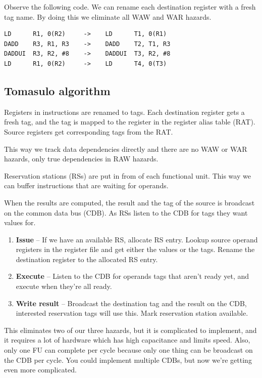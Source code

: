 \documentclass{article}
\begin{document}
Observe the following code. We can rename each destination register with a fresh tag name. By doing this we eliminate all WAW and WAR hazards.

\begin{verbatim}
LD      R1, 0(R2)     ->    LD      T1, 0(R1)      
DADD    R3, R1, R3    ->    DADD    T2, T1, R3
DADDUI  R3, R2, #8    ->    DADDUI  T3, R2, #8      
LD      R1, 0(R2)     ->    LD      T4, 0(T3)
\end{verbatim}

\subsection{Tomasulo algorithm}

Registers in instructions are renamed to tags. Each destination register gets a fresh tag, and the tag is mapped to the register in the register alias table (RAT). Source registers get corresponding tags from the RAT. 

This way we track data dependencies directly and there are no WAW or WAR hazards, only true dependencies in RAW hazards. 

Reservation stations (RSs) are put in from of each functional unit. This way we can buffer instructions that are waiting for operands. 

When the results are computed, the result and the tag of the source is broadcast on the common data bus (CDB). As RSs listen to the CDB for tags they want values for.

\begin{enumerate}
\item \textbf{Issue} -- If we have an available RS, allocate RS entry. Lookup source operand registers in the register file and get either the values or the tags. Rename the destination register to the allocated RS entry. 

\item \textbf{Execute} -- Listen to the CDB for operands tags that aren't ready yet, and execute when they're all ready. 

\item \textbf{Write result} -- Broadcast the destination tag and the result on the CDB, interested reservation tags will use this. Mark reservation station available.
\end{enumerate}

This eliminates two of our three hazards, but it is complicated to implement, and it requires a lot of hardware which has high capacitance and limits speed. Also, only one FU can complete per cycle because only one thing can be broadcast on the CDB per cycle. You could implement multiple CDBs, but now we're getting even more complicated. 
\end{document}
